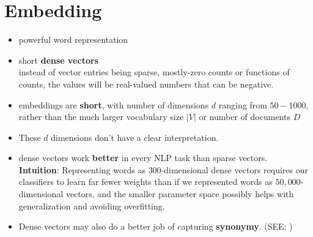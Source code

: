 \section{Embedding \cite{nlp-1}}\label{Embedding}
\begin{itemize}
    \item powerful word representation
    
    \item short \textbf{dense vectors} \\
    instead of vector entries being sparse, mostly-zero counts or functions of counts, the values will be real-valued numbers that can be negative.

    \item embeddings are \textbf{short}, with number of dimensions $d$ ranging from $50-1000$, rather than the much larger vocabulary size $|V|$ or number of documents $D$

    \item These $d$ dimensions don’t have a clear interpretation.

    \item dense vectors work \textbf{better} in every NLP task than sparse vectors.\\
    \textbf{Intuition}: Representing words as $300$-dimensional dense vectors requires our classifiers to learn far fewer weights than if we represented words as $50,000$-dimensional vectors, and the smaller parameter space possibly helps with generalization and avoiding overfitting.

    \item Dense vectors may also do a better job of capturing \textbf{synonymy}. (SEE: )

    
\end{itemize}

